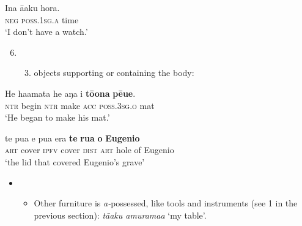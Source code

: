 \ea\label{ex:6.85}
\gll {\ꞌ}Ina {\ꞌ}ā{\ꞌ}aku hora. \\
\textsc{neg} \textsc{poss.1sg.a} time \\

\glt
‘I don’t have a watch.’  
\z

\begin{enumerate}
\setcounter{enumi}{5}
\item[]
\begin{enumerate}
\setcounter{enumii}{2}
\item 
objects supporting or containing the body:

\end{enumerate}
\end{enumerate}

\ea\label{ex:6.86}
\gll He ha{\ꞌ}amata he aŋa i \textbf{tō{\ꞌ}ona} \textbf{pē{\ꞌ}ue}. \\
\textsc{ntr} begin \textsc{ntr} make \textsc{acc} \textsc{poss.3sg.o} mat \\

\glt 
‘He began to make his mat.’ \textstyleExampleref{[R344.030]} 
\z

\ea\label{ex:6.87}
\gll te pu{\ꞌ}a e pu{\ꞌ}a era \textbf{te} \textbf{rua} \textbf{o} \textbf{Eugenio} \\
\textsc{art} cover \textsc{ipfv} cover \textsc{dist} \textsc{art} hole of Eugenio \\

\glt
‘the lid that covered Eugenio’s grave’ \textstyleExampleref{[R231.353]} 
\z

\begin{itemize}
\item[]
\begin{itemize}
\item[]
Other furniture is \textit{a-}possessed, like tools and instruments (see 1 in the previous section): \textit{tā{\ꞌ}aku {\ꞌ}amurama{\ꞌ}a} ‘my table’.
\end{itemize}
\end{itemize}

